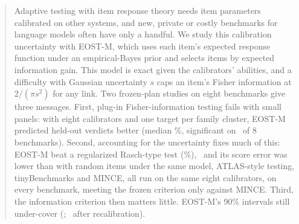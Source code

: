 \begin{abstract}
Adaptive testing with item response theory needs item parameters calibrated on other
systems, and new, private or costly benchmarks for language models often have only a
handful. We study this calibration uncertainty with EOST-M, which uses each item's expected
response function under an empirical-Bayes prior and selects items by expected information
gain. This model is exact given the calibrators' abilities, and a difficulty with Gaussian
uncertainty $s$ caps an item's Fisher information at $2/(\pi s^2)$ for any link. Two
frozen-plan studies on eight benchmarks give three messages.
First, plug-in Fisher-information testing fails with small panels: with eight calibrators and
one target per family cluster, EOST-M predicted held-out verdicts better (median
\STwoRTwoMed\%, significant on \STwoRTwoFav\ of 8 benchmarks). Second, accounting for the
uncertainty fixes much of this: EOST-M beat a regularized Rasch-type test (\STwoCOneMed\%),
\AbstractFB\ and its score error was lower than with random items under the same model,
ATLAS-style testing, tinyBenchmarks and MINCE, all run on the same eight calibrators, on every
benchmark, meeting the frozen criterion only against MINCE. Third, the information criterion then matters little.
EOST-M's 90\% intervals still under-cover (\STwoCoveigmg; \STwoCoveigmgRR\ after
recalibration).
\end{abstract}
